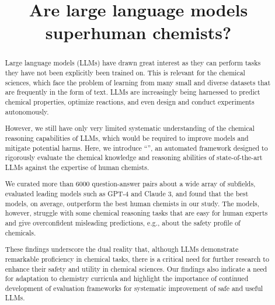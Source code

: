 \documentclass[11pt, oneside]{article}
\title{\textsf{Are large language models superhuman chemists?}}
\begin{document}
\maketitle


\clearpage
\begin{abstract}
    Large language models (LLMs) have drawn great interest as they can perform tasks they have not been explicitly been trained on. 
    This is relevant for the chemical sciences, which face the problem of learning from many small and diverse datasets that are frequently in the form of text.
    LLMs are increasingly being harnessed to predict chemical properties, optimize reactions, and even design and conduct experiments autonomously.

    However, we still have only very limited systematic understanding of the chemical reasoning capabilities of LLMs, which would be required to improve models and mitigate potential harms. 
    Here, we introduce \enquote{\chembench}, an automated framework designed to rigorously evaluate the chemical knowledge and reasoning abilities of state-of-the-art LLMs against the expertise of human chemists.

    We curated more than 6000 question-answer pairs about a wide array of subfields, evaluated leading models such as GPT-4 and Claude 3, and found that the best models, on average, outperform the best human chemists in our study. 
    The models, however, struggle with some chemical reasoning tasks that are easy for human experts and give overconfident misleading predictions, e.g., about the safety profile of chemicals. 

    These findings underscore the dual reality that, although LLMs demonstrate remarkable proficiency in chemical tasks, there is a critical need for further research to enhance their safety and utility in chemical sciences.
    Our findings also indicate a need for adaptation to chemistry curricula and highlight the importance of continued development of evaluation frameworks for systematic improvement of safe and useful LLMs.
\end{abstract}
\end{document}

